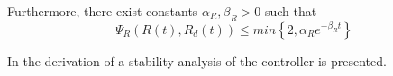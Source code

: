 Furthermore, there exist constants $ \alpha_R,\beta_R>0 $ such that
\begin{equation}\label{eq:con.PsiRconv}
\Psi_R(R(t),R_d(t)) \leq min\left\lbrace 2,\alpha_Re^{-\beta_Rt}\right\rbrace 
\end{equation}



In \cite{Lee2010} the derivation of a stability analysis of the controller is presented. 


